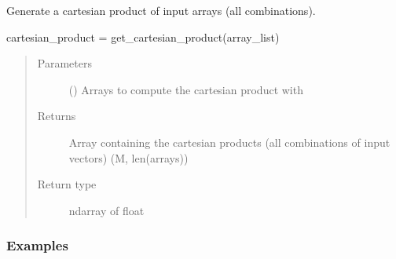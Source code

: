 \documentclass[letterpaper,10pt,english,openany,oneside]{sphinxmanual}
\begin{document}
\begin{fulllineitems}
\label{\detokenize{pygpc:pygpc.misc.get_cartesian_product}}
Generate a cartesian product of input arrays (all combinations).

cartesian\_product = get\_cartesian\_product(array\_list)
\begin{quote}\begin{description}
\item[{Parameters}] \leavevmode
{} () \textendash{} Arrays to compute the cartesian product with

\item[{Returns}] \leavevmode
{} \textendash{} Array containing the cartesian products (all combinations of input vectors)
(M, len(arrays))

\item[{Return type}] \leavevmode
ndarray of float

\end{description}\end{quote}
\subsubsection*{Examples}

\begin{sphinxVerbatim}[commandchars=\\\{\}]
 
  \PYG{p}{[}  \PYG{p}{]} \PYG{p}{[} \PYG{p}{]} \PYG{p}{[} \PYG{p}{]}
\end{sphinxVerbatim}

\end{fulllineitems}

\end{document}
